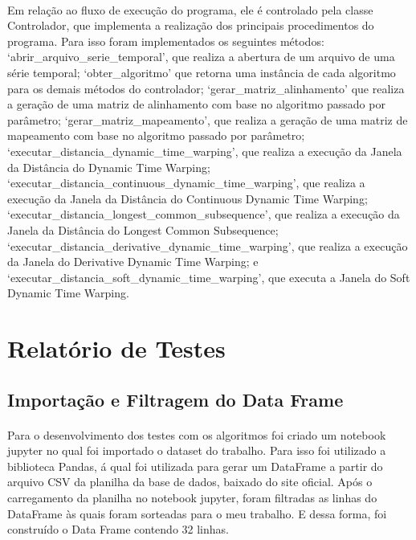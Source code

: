 \documentclass[12pt]{article}
\begin{document}
\paragraph{}Em relação ao fluxo de execução do programa, ele é controlado pela classe Controlador, que implementa a realização dos principais procedimentos do programa. Para isso foram implementados os seguintes métodos: ‘abrir\_arquivo\_serie\_temporal’, que realiza a abertura de um arquivo de uma série temporal; ‘obter\_algoritmo’ que retorna uma instância de cada algoritmo para os demais métodos do controlador; ‘gerar\_matriz\_alinhamento’ que realiza a geração de uma matriz de alinhamento com base no algoritmo passado por parâmetro; ‘gerar\_matriz\_mapeamento’, que realiza a geração de uma matriz de mapeamento com base no algoritmo passado por parâmetro; ‘executar\_distancia\_dynamic\_time\_warping’, que realiza a execução da Janela da Distância do Dynamic Time Warping; ‘executar\_distancia\_continuous\_dynamic\_time\_warping’, que realiza a execução da Janela da Distância do Continuous Dynamic Time Warping; ‘executar\_distancia\_longest\_common\_subsequence’, que realiza a execução da Janela da Distância do Longest Common Subsequence; ‘executar\_distancia\_derivative\_dynamic\_time\_warping’, que realiza a execução da Janela do Derivative Dynamic Time Warping; e ‘executar\_distancia\_soft\_dynamic\_time\_warping’, que executa a Janela do Soft Dynamic Time Warping.


\section{Relatório de Testes}

\subsection{Importação e Filtragem do Data Frame}

\paragraph{}Para o desenvolvimento dos testes com os algoritmos foi criado um notebook jupyter no qual foi importado o dataset do trabalho. Para isso foi utilizado a biblioteca Pandas, á qual foi utilizada para gerar um DataFrame a partir do arquivo CSV da planilha da base de dados, baixado do site oficial. Após o carregamento da planilha no notebook jupyter, foram filtradas as linhas do DataFrame às quais foram sorteadas para o meu trabalho. E dessa forma, foi construído o Data Frame contendo 32 linhas.
\end{document}
